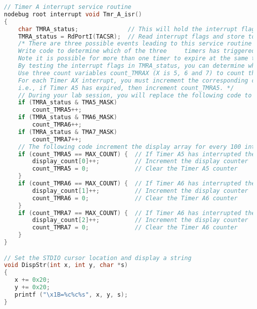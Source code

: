 \begin{lstlisting}[language=C]
// Timer A interrupt service routine
nodebug root interrupt void Tmr_A_isr()
{
    char TMRA_status;              // This will hold the interrupt flags
    TMRA_status = RdPortI(TACSR);  // Read interrupt flags and store to TMRA_status
    /* There are three possible events leading to this service routine being called
    Write code to determine which of the three     timers has triggered the interrupt.
    Note it is possible for more than one timer to expire at the same time, thus your code must service all triggers.
    By testing the interrupt flags in TMRA_status, you can determine which counters have expired.
    Use three count variables count_TMRAX (X is 5, 6 and 7) to count the number of interrupts.
    For each Timer AX interrupt, you must increment the corresponding count variable.
    i.e., if Timer A5 has expired, then increment count_TMRA5. */
    // During your lab session, you will replace the following code to perform as specified above
    if (TMRA_status & TMA5_MASK)
    	count_TMRA5++;
    if (TMRA_status & TMA6_MASK)
    	count_TMRA6++;
    if (TMRA_status & TMA7_MASK)
    	count_TMRA7++;
    // The following code increment the display array for every 100 interrupts for a respective timer and resets the count variable
    if (count_TMRA5 == MAX_COUNT) {  // If Timer A5 has interrupted the CPU 100 times
        display_count[0]++;          // Increment the display counter
        count_TMRA5 = 0;             // Clear the Timer A5 counter
    }
    if (count_TMRA6 == MAX_COUNT) {  // If Timer A6 has interrupted the CPU 100 times
        display_count[1]++;          // Increment the display counter
        count_TMRA6 = 0;             // Clear the Timer A6 counter
    }
    if (count_TMRA7 == MAX_COUNT) {  // If Timer A6 has interrupted the CPU 100 times
        display_count[2]++;          // Increment the display counter
        count_TMRA7 = 0;             // Clear the Timer A6 counter
    }
}

// Set the STDIO cursor location and display a string
void DispStr(int x, int y, char *s)
{
   x += 0x20;
   y += 0x20;
   printf ("\x1B=%c%c%s", x, y, s);
}
\end{lstlisting}